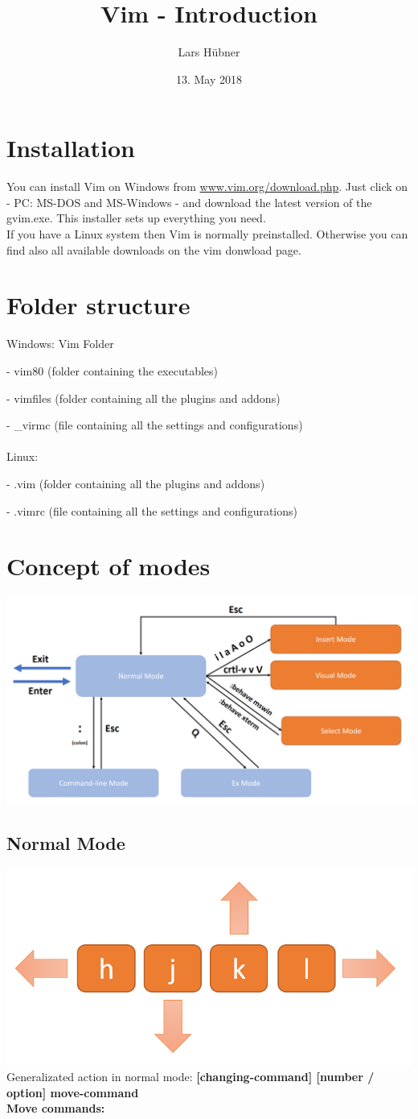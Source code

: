 \documentclass[a4paper, 10pt]{scrartcl}
\title{Vim - Introduction}
\author{Lars Hübner}
\date{13. May 2018}
\begin{document}
\section{Installation}
You can install Vim on Windows from \href{www.vim.org/download.php}{www.vim.org/download.php}.
Just click on - PC: MS-DOS and MS-Windows - and download the latest version of the gvim.exe. This installer sets up everything you need. 
\\
If you have a Linux system then Vim is normally preinstalled. Otherwise you can find also all available downloads on the vim donwload page.
\section{Folder structure}
Windows: Vim Folder

- vim80 (folder containing the executables)

- vimfiles (folder containing all the plugins and addons)

- \_virmc (file containing all the settings and configurations)
\\
\\
Linux:

- .vim (folder containing all the plugins and addons)

- .vimrc (file containing all the settings and configurations)
\section{Concept of modes}
\includegraphics[width=.8\linewidth]{modes.png}
\subsection*{Normal Mode}
\includegraphics[width=.4\linewidth]{keys.png}
\\
Generalizated action in normal mode: \textbf{[changing-command] [number / option] move-command}
\\
\textbf{Move commands:}
\end{document}
